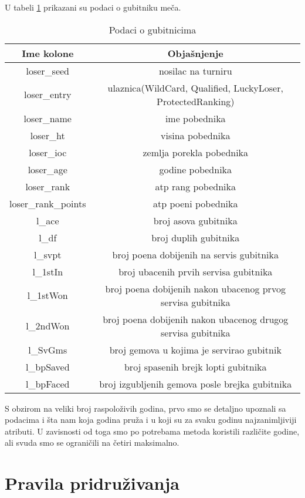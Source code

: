\documentclass[a4paper]{article}
\begin{document}
U tabeli \ref{table:gubitnici} prikazani su podaci o gubitniku meča.
\begin{table}
		\begin{tabular}{ | c | c | } 
			\hline
			Ime kolone & Objašnjenje \\ 
			\hline
			loser\_seed & nosilac na turniru \\
			loser\_entry & ulaznica(WildCard, Qualified, LuckyLoser, ProtectedRanking) \\
			loser\_name & ime pobednika \\
			loser\_ht & visina pobednika \\
			loser\_ioc & zemlja porekla pobednika \\
			loser\_age & godine pobednika \\
			loser\_rank & atp rang pobednika \\
			loser\_rank\_points & atp poeni pobednika \\ 
			l\_ace & broj asova gubitnika \\
			l\_df & broj duplih gubitnika \\
			l\_svpt & broj poena dobijenih na servis gubitnika \\
			l\_1stIn & broj ubacenih prvih servisa gubitnika \\
			l\_1stWon & broj poena dobijenih nakon ubacenog prvog servisa gubitnika \\
			l\_2ndWon & broj poena dobijenih nakon ubacenog drugog servisa gubitnika \\
			l\_SvGms & broj gemova u kojima je servirao gubitnik \\
			l\_bpSaved & broj spasenih brejk lopti gubitnika \\
			l\_bpFaced & broj izgubljenih gemova posle brejka gubitnika \\
			\hline
		\end{tabular}
	\caption{Podaci o gubitnicima}
	\label{table:gubitnici}
\end{table}

S obzirom na veliki broj raspoloživih godina, prvo smo se detaljno upoznali sa podacima i šta nam koja godina pruža i u koji su za svaku godinu najzanimljiviji atributi. U zavisnosti od toga smo po potrebama metoda koristili različite godine, ali svuda smo se ograničili na četiri maksimalno.

\section{Pravila pridruživanja}
\end{document}
